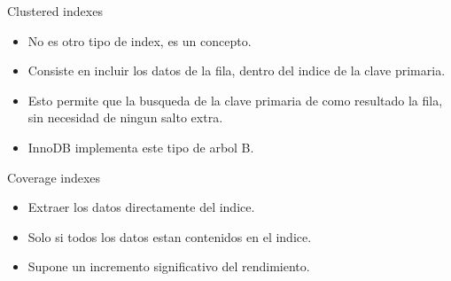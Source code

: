\begin{frame}{Clustered indexes}
  \begin{itemize}
    \item No es otro tipo de index, es un concepto.
    \item Consiste en incluir los datos de la fila, dentro del indice de la clave primaria.
    \item Esto permite que la busqueda de la clave primaria de como resultado la fila, sin necesidad de ningun salto extra.
    \item InnoDB implementa este tipo de arbol B.
  \end{itemize}
\end{frame}

\begin{frame}{Coverage indexes}
  \begin{itemize}
    \item Extraer los datos directamente del indice.
    \item Solo si todos los datos estan contenidos en el indice.
    \item Supone un incremento significativo del rendimiento.
  \end{itemize}
\end{frame}
